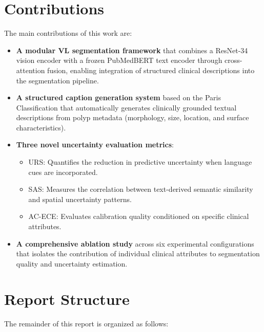\section{Contributions}
\label{sec:intro:contributions}

The main contributions of this work are:

\begin{itemize}
	\item \textbf{A modular \ac{VL} segmentation framework} that combines a \ac{ResNet}-34 vision encoder with a frozen \ac{PubMedBERT} text encoder through cross-attention fusion, enabling integration of structured clinical descriptions into the segmentation pipeline.
	
	\item \textbf{A structured caption generation system} based on the Paris Classification that automatically generates clinically grounded textual descriptions from polyp metadata (morphology, size, location, and surface characteristics).
	
	\item \textbf{Three novel uncertainty evaluation metrics}:
	\begin{itemize}
		\item \ac{URS}: Quantifies the reduction in predictive uncertainty when language cues are incorporated.
		\item \ac{SAS}: Measures the correlation between text-derived semantic similarity and spatial uncertainty patterns.
		\item \ac{AC-ECE}: Evaluates calibration quality conditioned on specific clinical attributes.
	\end{itemize}
	
	\item \textbf{A comprehensive ablation study} across six experimental configurations that isolates the contribution of individual clinical attributes to segmentation quality and uncertainty estimation.
\end{itemize}

\section{Report Structure}
\label{sec:intro:structure}

The remainder of this report is organized as follows:

